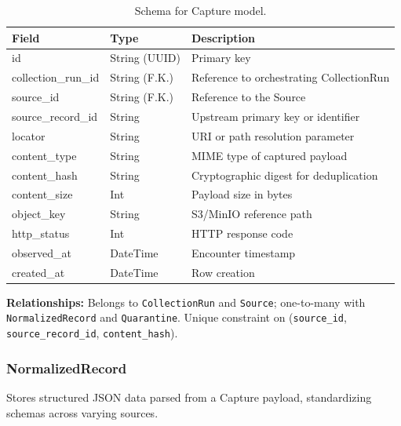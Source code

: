 \begin{table}[h]
\centering
\begin{tabular}{|l|l|l|}
\hline
\textbf{Field} & \textbf{Type} & \textbf{Description} \\
\hline
id & String (UUID) & Primary key \\
collection\_run\_id & String (F.K.) & Reference to orchestrating CollectionRun \\
source\_id & String (F.K.) & Reference to the Source \\
source\_record\_id & String & Upstream primary key or identifier \\
locator & String & URI or path resolution parameter \\
content\_type & String & MIME type of captured payload \\
content\_hash & String & Cryptographic digest for deduplication \\
content\_size & Int & Payload size in bytes \\
object\_key & String & S3/MinIO reference path \\
http\_status & Int & HTTP response code \\
observed\_at & DateTime & Encounter timestamp \\
created\_at & DateTime & Row creation \\
\hline
\end{tabular}
\caption{Schema for Capture model.}
\end{table}
\noindent \textbf{Relationships:} Belongs to \texttt{CollectionRun} and \texttt{Source}; one-to-many with \texttt{NormalizedRecord} and \texttt{Quarantine}. Unique constraint on (\texttt{source\_id}, \texttt{source\_record\_id}, \texttt{content\_hash}).

\subsubsection{NormalizedRecord}
Stores structured JSON data parsed from a Capture payload, standardizing schemas across varying sources.

